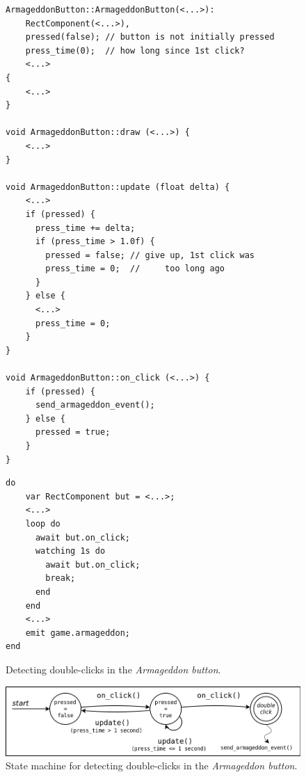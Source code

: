 \documentclass[10pt, conference, compsocconf]{IEEEtran}
\newcommand{\CEU}{\textsc{C\'{e}u}\xspace}
\newcommand{\code}[1] {{\small{\texttt{#1}}}}
\newcommand{\ax}{\code{[a]}\xspace}
\newcommand{\bx}{\code{[b]}\xspace}
\begin{document}
\begin{figure}[t]
\begin{lstlisting}[numbers=right]
ArmageddonButton::ArmageddonButton(<...>):
    RectComponent(<...>),
    pressed(false); // button is not initially pressed
    press_time(0);  // how long since 1st click?
    <...>
{
    <...>
}

void ArmageddonButton::draw (<...>) {
    <...>
}

void ArmageddonButton::update (float delta) {
    <...>
    if (pressed) {
      press_time += delta;
      if (press_time > 1.0f) {
        pressed = false; // give up, 1st click was
        press_time = 0;  //     too long ago
      }
    } else {
      <...>
      press_time = 0;
    }
}

void ArmageddonButton::on_click (<...>) {
    if (pressed) {
      send_armageddon_event();
    } else {
      pressed = true;
    }
}
\end{lstlisting}
%
\end{figure}
\begin{figure}[t]
\begin{lstlisting}[xleftmargin=2em]
do
    var RectComponent but = <...>;
    <...>
    loop do
      await but.on_click;
      watching 1s do
        await but.on_click;
        break;
      end
    end
    <...>
    emit game.armageddon;
end
\end{lstlisting}
\caption{ Detecting double-clicks in the \emph{Armageddon button}.
\label{lst.armageddon}
}
\end{figure}

\begin{figure}
\centering
\includegraphics[width=\columnwidth]{double-click}
\caption{State machine for detecting double-clicks in the
         \emph{Armageddon button}.
\label{fig.armageddon.fsm}
}
\end{figure}
\end{document}
